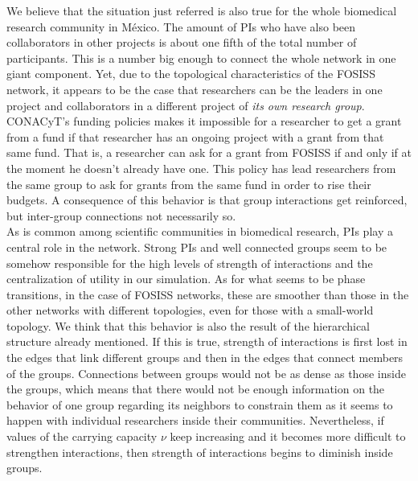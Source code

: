 \documentclass{bmcart}
\begin{document}
  We believe that the situation just referred is also
  true for the whole biomedical research community in M\'exico. The
  amount of PIs who have also been collaborators in other projects is
  about one fifth of the total number of participants.  This is a
  number big enough to connect the whole network in one giant
  component. Yet, due to the topological characteristics of the FOSISS
  network, it appears to be the case that researchers can be the
  leaders in one project and collaborators in a different project of
  \emph{its own research group}. CONACyT's funding policies makes it
  impossible for a researcher to get a grant from a fund if that
  researcher has an ongoing project with a grant from that same
  fund. That is, a researcher can ask for a grant from FOSISS if and
  only if at the moment he doesn't already have one.
  This policy has lead researchers from the same group to ask
  for grants from the same fund in order to rise their budgets. A
  consequence of this behavior is that group interactions get
  reinforced, but inter-group connections not necessarily so.\\

 As is common among scientific communities in biomedical
  research, PIs play a central role in the network. Strong PIs and
  well connected groups seem to be somehow responsible for the high
  levels of strength of interactions and the centralization of utility
  in our simulation. As for what seems to be phase transitions, in the
  case of FOSISS networks, these are smoother than those in the other
  networks with different topologies, even for those with a
  small-world topology. We think that this behavior is also the result
  of the hierarchical structure already mentioned. If this is true,
  strength of interactions is first lost in the edges that link
  different groups and then in the edges that connect members of the
  groups. Connections between groups would not be as dense as those
  inside the groups, which means that there would not be enough
  information on the behavior of one group regarding its neighbors to
  constrain them as it seems to happen with individual researchers
  inside their communities. Nevertheless, if values of the carrying
  capacity $\nu$ keep increasing and it becomes more difficult to
  strengthen interactions, then strength of interactions begins to
  diminish inside groups.\\
\end{document}
